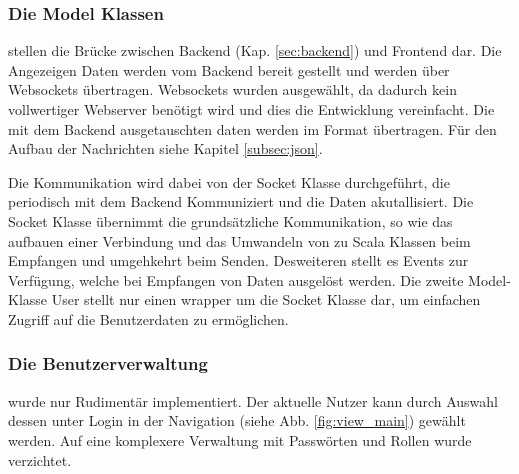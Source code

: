 \FloatBarrier
\subsubsection*{Die Model Klassen}
stellen die Brücke zwischen Backend (Kap. \ref{sec:backend}) und Frontend dar. Die Angezeigen Daten werden vom Backend bereit gestellt und werden über Websockets übertragen. Websockets wurden ausgewählt, da dadurch kein vollwertiger Webserver benötigt wird und dies die Entwicklung vereinfacht. Die mit dem Backend ausgetauschten daten werden im \JSON Format übertragen. Für den Aufbau der Nachrichten siehe Kapitel \ref{subsec:json}. 

Die Kommunikation wird dabei von der Socket Klasse durchgeführt, die periodisch mit dem Backend Kommuniziert und die Daten akutallisiert.
Die Socket Klasse übernimmt die grundsätzliche Kommunikation, so wie das aufbauen einer Verbindung und das Umwandeln von \JSON zu Scala Klassen beim Empfangen und umgehkehrt beim Senden. Desweiteren stellt es Events zur Verfügung, welche bei Empfangen von Daten ausgelöst werden.
Die zweite Model-Klasse User stellt nur einen wrapper um die Socket Klasse dar, um einfachen Zugriff auf die Benutzerdaten zu ermöglichen.

\FloatBarrier
\subsubsection*{Die Benutzerverwaltung}
wurde nur Rudimentär implementiert. Der aktuelle Nutzer kann durch Auswahl dessen unter Login in der Navigation (siehe Abb. \ref{fig:view_main}) gewählt werden. Auf eine komplexere Verwaltung mit Passwörten und Rollen wurde verzichtet.